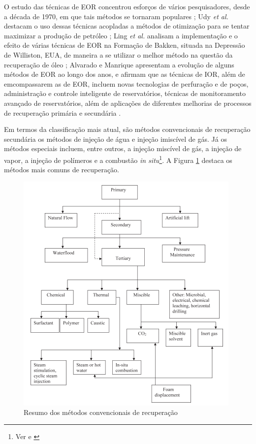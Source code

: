 O estudo das t\'{e}cnicas de EOR concentrou esfor\c{c}os de v\'{a}rios pesquisadores, desde a d\'{e}cada de 1970, em que tais m\'{e}todos se tornaram populares \cite{coats1982}; Udy \textit{et al.} destacam o uso dessas t\'{e}cnicas acopladas a m\'{e}todos de otimiza\c{c}\~{a}o para se tentar maximizar a produ\c{c}\~{a}o de petr\'{o}leo \cite{udyEOR}; Ling \textit{et al.} analisam a implementa\c{c}\~{a}o e o efeito de v\'{a}rias t\'{e}cnicas de EOR na Forma\c{c}\~{a}o de Bakken, situada na Depress\~{a}o de Williston, EUA, de maneira a se utilizar o melhor m\'{e}todo na quest\~{a}o da recupera\c{c}\~{a}o de \'{o}leo \cite{ling2014}; Alvarado e Manrique apresentam a evolu\c{c}\~{a}o de alguns m\'{e}todos de EOR ao longo dos anos, e afirmam que as t\'{e}cnicas de IOR, al\'{e}m de emcompassarem as de EOR, incluem novas tecnologias de perfura\c{c}\~{a}o e de po\c{c}os, administra\c{c}\~{a}o e controle inteligente de reservat\'{o}rios, t\'{e}cnicas de monitoramento avan\c{c}ado de reservat\'{o}rios, al\'{e}m de aplica\c{c}\~{o}es de diferentes melhorias de processos de recupera\c{c}\~{a}o prim\'{a}ria e secund\'{a}ria \cite{alvarado2010}.

Em termos da classifica\c{c}\~{a}o mais atual, s\~{a}o m\'{e}todos convencionais de recupera\c{c}\~{a}o secund\'{a}ria os m\'{e}todos de inje\c{c}\~{a}o de \'{a}gua e inje\c{c}\~{a}o imisc\'{i}vel de g\'{a}s. J\'{a} os m\'{e}todos especiais incluem, entre outros, a inje\c{c}\~{a}o misc\'{i}vel de g\'{a}s, a inje\c{c}\~{a}o de vapor, a inje\c{c}\~{a}o de pol\'{i}meros e a combust\~{a}o \textit{in situ}\footnote{Ver \cite{oil1976} e \cite[pp. 677-726]{engres}}. A Figura \ref{fig:recreview} destaca os m\'{e}todos mais comuns de recupera\c{c}\~{a}o.

\begin{figure}[!ht]
	\centering
	\includegraphics[width=.8\textwidth]{figs/revisao/revisao_recmethods}
	\caption{Resumo dos m\'{e}todos convencionais de recupera\c{c}\~{a}o \cite{adeniyi2008} \label{fig:recreview}}
\end{figure}

